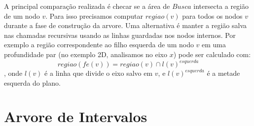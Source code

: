 

A principal comparação realizada é checar se a área de \(Busca\) intersecta a região
de um nodo \(v\). Para isso precisamos computar \(regiao(v)\) para todos os nodos \(v\)
durante a fase de construção da arvore.
Uma alternativa é manter a região salva nas chamadas recursivas usando as linhas guardadas
nos nodos internos. Por exemplo a região correspondente ao filho esquerda de um nodo
\(v\) em uma profundidade par (no exemplo 2D, analisamos no eixo \(x\)) pode ser calculado com:
\[
    regiao(fe(v)) = regiao(v) \cap l(v)^{esquerda}
\],
onde \(l(v)\) é a linha que divide o eixo salvo em \(v\), e \(l(v)^{esquerda}\) é a metade
esquerda do plano.


\section{Arvore de Intervalos}


